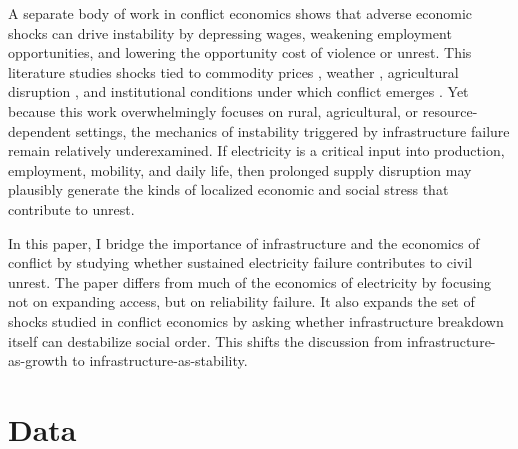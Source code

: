 \documentclass[12pt]{article}
\begin{document}
A separate body of work in conflict economics shows that adverse economic shocks can drive instability by depressing wages, weakening employment opportunities, and lowering the opportunity cost of violence or unrest. This literature studies shocks tied to commodity prices \citep{besley2008warsstatecapacity, dube2013commodityconflict, bazzi2014resourceinsurgency}, weather \citep{miguel2004economicshocksconflict, burke2015climateconflict, burke2024newevidenceclimateconflict}, agricultural disruption \citep{biscaye2025agriculturalshocksconflict}, and institutional conditions under which conflict emerges \citep{acemoglu2010persistencecivilwars,blattman2010civilwar}. Yet because this work overwhelmingly focuses on rural, agricultural, or resource-dependent settings, the mechanics of instability triggered by infrastructure failure remain relatively underexamined. If electricity is a critical input into production, employment, mobility, and daily life, then prolonged supply disruption may plausibly generate the kinds of localized economic and social stress that contribute to unrest.

In this paper, I bridge the importance of infrastructure and the economics of conflict by studying whether sustained electricity failure contributes to civil unrest. The paper differs from much of the economics of electricity by focusing not on expanding access, but on reliability failure. It also expands the set of shocks studied in conflict economics by asking whether infrastructure breakdown itself can destabilize social order. This shifts the discussion from infrastructure-as-growth to infrastructure-as-stability.

\section{Data}\label{sec:data}
\end{document}
